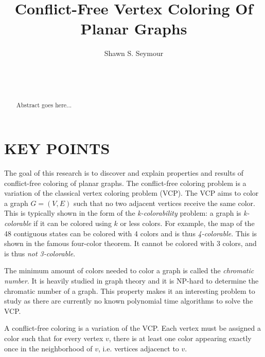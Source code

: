 \documentclass{sig-alternate}
\begin{document}

\title{Conflict-Free Vertex Coloring Of Planar Graphs}


\author{
\alignauthor
Shawn S. Seymour\\
	\\
	\\
	\\
}

\maketitle
\begin{abstract}
Abstract goes here...
\end{abstract}

\section*{KEY POINTS}
The goal of this research is to discover and explain properties and results of conflict-free coloring of planar graphs. The conflict-free coloring problem is a variation of the classical vertex coloring problem (VCP). The VCP aims to color a graph \(G = (V, E)\) such that no two adjacent vertices receive the same color. This is typically shown in the form of the \emph{k-colorability} problem: a graph is \emph{k-colorable} if it can be colored using $k$ or less colors. For example, the map of the 48 contiguous states can be colored with 4 colors and is thus \emph{4-colorable}. This is shown in the famous four-color theorem. It cannot be colored with 3 colors, and is thus \emph{not 3-colorable}.

The minimum amount of colors needed to color a graph is called the \emph{chromatic number}. It is heavily studied in graph theory and it is NP-hard to determine the chromatic number of a graph. This property makes it an interesting problem to study as there are currently no known polynomial time algorithms to solve the VCP.

A conflict-free coloring is a variation of the VCP. Each vertex must be assigned a color such that for every vertex $v$, there is at least one color appearing exactly once in the neighborhood of $v$, i.e. vertices adjacenct to $v$.
\end{document}
